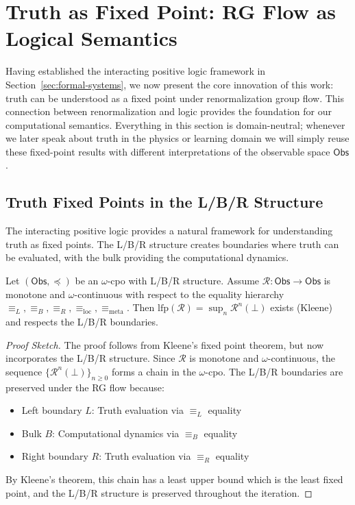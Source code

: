 \section{Truth as Fixed Point: RG Flow as Logical Semantics}
\label{sec:truth-fixed-point}

Having established the interacting positive logic framework in Section~\ref{sec:formal-systems}, we now present the core innovation of this work: truth can be understood as a fixed point under renormalization group flow. This connection between renormalization and logic provides the foundation for our computational semantics. Everything in this section is domain-neutral; whenever we later speak about truth in the physics or learning domain we will simply reuse these fixed-point results with different interpretations of the observable space $\mathsf{Obs}$.

\subsection{Truth Fixed Points in the L/B/R Structure}

The interacting positive logic provides a natural framework for understanding truth as fixed points. The L/B/R structure creates boundaries where truth can be evaluated, with the bulk providing the computational dynamics.

\begin{theorem}
\label{thm:truth-fixed-point-lbr}
Let $(\mathsf{Obs},\preceq)$ be an $\omega$-cpo with L/B/R structure. Assume $\mathcal{R}:\mathsf{Obs}\to\mathsf{Obs}$ is monotone and $\omega$-continuous with respect to the equality hierarchy $\equiv_L, \equiv_B, \equiv_R, \equiv_{\text{loc}}, \equiv_{\text{meta}}$. Then $\mathrm{lfp}(\mathcal{R})=\sup_n \mathcal{R}^n(\bot)$ exists (Kleene) and respects the L/B/R boundaries.
\end{theorem}

\begin{proof}[Proof Sketch]
The proof follows from Kleene's fixed point theorem, but now incorporates the L/B/R structure. Since $\mathcal{R}$ is monotone and $\omega$-continuous, the sequence $\{\mathcal{R}^n(\bot)\}_{n \geq 0}$ forms a chain in the $\omega$-cpo. The L/B/R boundaries are preserved under the RG flow because:
\begin{itemize}
\item Left boundary $L$: Truth evaluation via $\equiv_L$ equality
\item Bulk $B$: Computational dynamics via $\equiv_B$ equality  
\item Right boundary $R$: Truth evaluation via $\equiv_R$ equality
\end{itemize}
By Kleene's theorem, this chain has a least upper bound which is the least fixed point, and the L/B/R structure is preserved throughout the iteration.
\end{proof}

